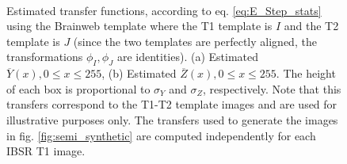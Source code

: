 \begin{figure}[H]
\centering
    \\
    \caption{Estimated transfer functions, according to eq. \eqref{eq:E_Step_stats} using the Brainweb template where the T1 template is $I$ and the T2 template is $J$
    (since the two templates are perfectly aligned, the transformations $\phi_{I}, \phi_{J}$ are identities). (a) Estimated $\overline{Y}(x), 0\leq x \leq 255$, (b) Estimated $\overline{Z}(x), 0\leq x \leq 255$. The height of each box is proportional to $\sigma_{Y}$ and $\sigma_{Z}$, respectively. Note that this transfers correspond to the T1-T2 template images and are used for illustrative purposes only. The transfers used to generate the images in fig. \ref{fig:semi_synthetic} are computed independently for each IBSR T1 image.}
\label{fig:transfers}
\end{figure}


